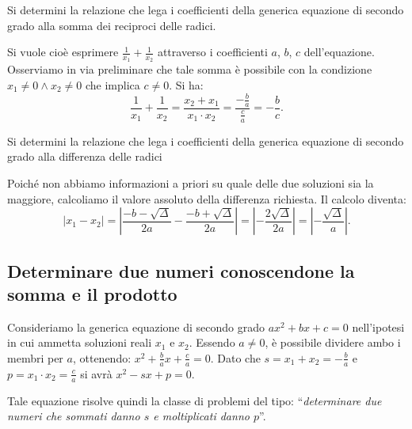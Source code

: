 \begin{esempio}
Si determini la relazione che lega i coefficienti della generica equazione di 
secondo grado alla somma dei reciproci delle radici.

Si vuole cioè esprimere \(\frac{1}{x_{1}} + \frac{1}{x_{2}}\) attraverso i 
coefficienti \(a\), \(b\), \(c\) dell'equazione. Osserviamo in via preliminare che 
tale somma è possibile con la condizione \(x_{1} \neq 0 \wedge x_{2} \neq 0\) che 
implica \(c \neq 0\). Si ha: 
\[\frac{1}{x_{1}} + \frac{1}{x_{2}} = \frac{x_{2} + x_{1}}{x
_{1} \cdot x_{2}} = \frac{- \frac{b}{a}}{\frac{c}{a}} = - \frac{b}{c}.\]
\end{esempio}

\begin{esempio}
Si determini la relazione che lega i coefficienti della generica equazione di 
secondo grado alla differenza delle radici

Poiché non abbiamo informazioni a priori su quale delle due soluzioni sia la 
maggiore, calcoliamo il valore assoluto della differenza richiesta. Il calcolo 
diventa: \[
\left\lvert x_{1} - x_{2} \right\rvert = \left\lvert \frac{- b 
-\sqrt{\Delta}}{2 
a} - \frac{- b + \sqrt{\Delta}}{2 a} \right\rvert =\left\lvert - \frac{2 
\sqrt{\Delta}}{2 a} \right\rvert = \left\lvert -\frac{\sqrt{\Delta}}{a} 
\right\rvert.
\]
\end{esempio}

\subsection{Determinare due numeri conoscendone la somma e il prodotto}

Consideriamo la generica equazione di secondo grado \(a x^{2} + bx + c = 0\) 
nell'ipotesi in cui ammetta soluzioni reali \(x_{1}\) e \(x_{2}\). Essendo \(a \neq 
0\), è possibile dividere ambo i membri per \(a\), ottenendo: \(x^{2} + \frac{b}{a} 
x + \frac{c}{a} = 0\). Dato che \(s = x_{1} + x_{2} = - \frac{b}{a}\) e \(p = x_{1} 
\cdot x_{2} = \frac{c}{a}\) si avrà \(x^{2} - s x + p = 0\).

Tale equazione risolve quindi la classe di problemi del tipo: 
``\emph{determinare due numeri che sommati danno \(s\) e moltiplicati danno 
\(p\)}''.

